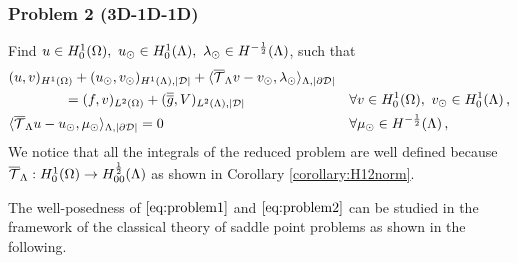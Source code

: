 \documentclass[r]{siamart171218}
\begin{document}
\subsubsection*{Problem 2 (3D-1D-1D)}
Find $u \in H^1_0(\Omega),\ u_{\odot} \in H^1_0(\Lambda), \ \lambda_{\odot} \in H^{-\frac12}(\Lambda)$, such that
\begin{subequations}\label{eq:problem2}
\begin{align}
&(u,v)_{H^1(\Omega)} + (u_{\odot},v_{\odot})_{H^1(\Lambda),|\mathcal{D}|} 
+  \langle {\overline{\mathcal{T}}_\Lambda} v - v_{\odot}, \lambda_{\odot} \rangle_{\Lambda, |\partial\mathcal{D}|} &&
\\
\nonumber
&\qquad\qquad= (f,v)_{L^2(\Omega)} +  (\overline{\overline{g}},V)_{L^2(\Lambda),|\mathcal{D}|}
\quad && \forall v \in H^1_0(\Omega), \ v_{\odot} \in H^1_0(\Lambda)\,,
\\
& \langle {\overline{\mathcal{T}}_\Lambda} u -   u_{\odot}, \mu_{\odot} \rangle_{\Lambda,|\partial\mathcal{D}|} = 0
\quad &&\forall \mu_{\odot} \in H^{-\frac12}(\Lambda)\,,
\end{align}
\end{subequations}
We notice that all the integrals of the reduced problem are well defined because 
${\overline{\mathcal{T}}_\Lambda}: H^1_0(\Omega) \rightarrow H^\frac12_{00}(\Lambda)$ as shown in Corollary \ref{corollary:H12norm}.

The well-posedness of $\eqref{eq:problem1}$ and $\eqref{eq:problem2}$ 
can be studied in the framework of the classical theory of saddle point problems as shown in the following.




%












\appendix

\end{document}
